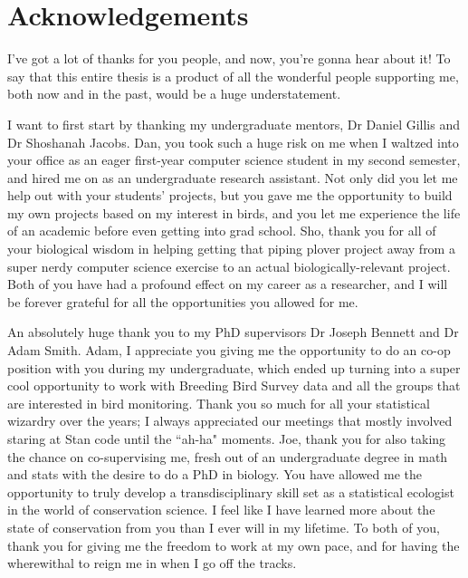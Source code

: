 \chapter*{Acknowledgements}


\par I've got a lot of thanks for you people, and now, you're gonna hear about it! 
To say that this entire thesis is a product of all the wonderful people supporting me, both now and in the past, would be a huge understatement.

\par I want to first start by thanking my undergraduate mentors, Dr Daniel Gillis and Dr Shoshanah Jacobs.
Dan, you took such a huge risk on me when I waltzed into your office as an eager first-year computer science student in my second semester, and hired me on as an undergraduate research assistant.
Not only did you let me help out with your students' projects, but you gave me the opportunity to build my own projects based on my interest in birds, and you let me experience the life of an academic before even getting into grad school.
Sho, thank you for all of your biological wisdom in helping getting that piping plover project away from a super nerdy computer science exercise to an actual biologically-relevant project. 
Both of you have had a profound effect on my career as a researcher, and I will be forever grateful for all the opportunities you allowed for me.

\par An absolutely huge thank you to my PhD supervisors Dr Joseph Bennett and Dr Adam Smith.
Adam, I appreciate you giving me the opportunity to do an co-op position with you during my undergraduate, which ended up turning into a super cool opportunity to work with Breeding Bird Survey data and all the groups that are interested in bird monitoring.
Thank you so much for all your statistical wizardry over the years; I always appreciated our meetings that mostly involved staring at Stan code until the ``ah-ha" moments.
Joe, thank you for also taking the chance on co-supervising me, fresh out of an undergraduate degree in math and stats with the desire to do a PhD in biology.
You have allowed me the opportunity to truly develop a transdisciplinary skill set as a statistical ecologist in the world of conservation science.
I feel like I have learned more about the state of conservation from you than I ever will in my lifetime.
To both of you, thank you for giving me the freedom to work at my own pace, and for having the wherewithal to reign me in when I go off the tracks.

